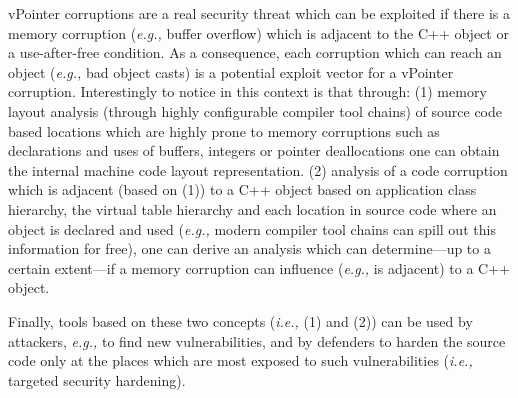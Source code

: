 vPointer corruptions are a real security threat which can be exploited if there is a memory corruption (\textit{e.g.,} buffer overflow) which is adjacent to the C++ object or a use-after-free condition. As a consequence, each corruption which can reach an object (\textit{e.g.,} bad object casts) is a potential exploit vector for a vPointer corruption. Interestingly to notice in this context is that through:
(1) memory layout analysis (through highly configurable compiler tool chains) of source code based locations which are highly prone to memory corruptions such as declarations and uses of buffers, integers or pointer deallocations one can obtain the internal machine code layout representation.
(2) analysis of a code corruption which is adjacent (based on (1)) to a C++ object based on application class hierarchy, the virtual table hierarchy and each location in source code where an object is declared and used (\textit{e.g.,} modern compiler tool chains can spill out this information for free), one can derive an analysis which can determine---up to a certain extent---if a memory corruption can influence (\textit{e.g.,} is adjacent) to a C++ object.

Finally, tools based on these two concepts (\textit{i.e.,} (1) and (2)) can be used by attackers, \textit{e.g.,} to find new vulnerabilities, and by defenders to harden the source code only at the places which are most exposed to such vulnerabilities (\textit{i.e.,} targeted security hardening).

